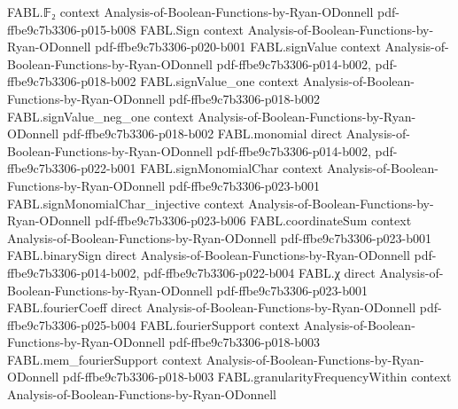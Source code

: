 \begin{theorem}
\leanok
{}
\proofstep
  {FABL.𝔽₂}
  {context}
  {Analysis-of-Boolean-Functions-by-Ryan-ODonnell}
  {pdf-ffbe9c7b3306-p015-b008}
\proofstep
  {FABL.Sign}
  {context}
  {Analysis-of-Boolean-Functions-by-Ryan-ODonnell}
  {pdf-ffbe9c7b3306-p020-b001}
\proofstep
  {FABL.signValue}
  {context}
  {Analysis-of-Boolean-Functions-by-Ryan-ODonnell}
  {pdf-ffbe9c7b3306-p014-b002,
    pdf-ffbe9c7b3306-p018-b002}
\proofstep
  {FABL.signValue_one}
  {context}
  {Analysis-of-Boolean-Functions-by-Ryan-ODonnell}
  {pdf-ffbe9c7b3306-p018-b002}
\proofstep
  {FABL.signValue_neg_one}
  {context}
  {Analysis-of-Boolean-Functions-by-Ryan-ODonnell}
  {pdf-ffbe9c7b3306-p018-b002}
\proofstep
  {FABL.monomial}
  {direct}
  {Analysis-of-Boolean-Functions-by-Ryan-ODonnell}
  {pdf-ffbe9c7b3306-p014-b002,
    pdf-ffbe9c7b3306-p022-b001}
\proofstep
  {FABL.signMonomialChar}
  {context}
  {Analysis-of-Boolean-Functions-by-Ryan-ODonnell}
  {pdf-ffbe9c7b3306-p023-b001}
\proofstep
  {FABL.signMonomialChar_injective}
  {context}
  {Analysis-of-Boolean-Functions-by-Ryan-ODonnell}
  {pdf-ffbe9c7b3306-p023-b006}
\proofstep
  {FABL.coordinateSum}
  {context}
  {Analysis-of-Boolean-Functions-by-Ryan-ODonnell}
  {pdf-ffbe9c7b3306-p023-b001}
\proofstep
  {FABL.binarySign}
  {direct}
  {Analysis-of-Boolean-Functions-by-Ryan-ODonnell}
  {pdf-ffbe9c7b3306-p014-b002,
    pdf-ffbe9c7b3306-p022-b004}
\proofstep
  {FABL.χ}
  {direct}
  {Analysis-of-Boolean-Functions-by-Ryan-ODonnell}
  {pdf-ffbe9c7b3306-p023-b001}
\proofstep
  {FABL.fourierCoeff}
  {direct}
  {Analysis-of-Boolean-Functions-by-Ryan-ODonnell}
  {pdf-ffbe9c7b3306-p025-b004}
\proofstep
  {FABL.fourierSupport}
  {context}
  {Analysis-of-Boolean-Functions-by-Ryan-ODonnell}
  {pdf-ffbe9c7b3306-p018-b003}
\proofstep
  {FABL.mem_fourierSupport}
  {context}
  {Analysis-of-Boolean-Functions-by-Ryan-ODonnell}
  {pdf-ffbe9c7b3306-p018-b003}
\proofstep
  {FABL.granularityFrequencyWithin}
  {context}
  {Analysis-of-Boolean-Functions-by-Ryan-ODonnell}

\end{theorem}
